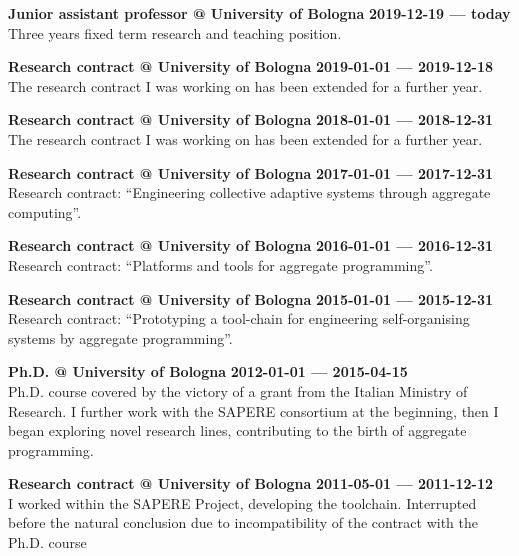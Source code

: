 \textbf{Junior assistant professor @ University of Bologna} \hfill \textbf{2019-12-19 --- today}\\
Three years fixed term research and teaching position.

\halfblankline{}

\textbf{Research contract @ University of Bologna} \hfill \textbf{2019-01-01 --- 2019-12-18}\\
The research contract I was working on has been extended for a further year.

\halfblankline{}

\textbf{Research contract @ University of Bologna} \hfill \textbf{2018-01-01 --- 2018-12-31}\\
The research contract I was working on has been extended for a further year.

\halfblankline{}

\textbf{Research contract @ University of Bologna} \hfill \textbf{2017-01-01 --- 2017-12-31}\\
Research contract: ``Engineering collective adaptive systems through aggregate computing''.

\halfblankline{}

\textbf{Research contract @ University of Bologna} \hfill \textbf{2016-01-01 --- 2016-12-31}\\
Research contract: ``Platforms and tools for aggregate programming''.

\halfblankline{}

\textbf{Research contract @ University of Bologna} \hfill \textbf{2015-01-01 --- 2015-12-31}\\
Research contract: ``Prototyping a tool-chain for engineering self-organising systems by aggregate programming''.

\halfblankline{}

\textbf{Ph.D. @ University of Bologna} \hfill \textbf{2012-01-01 --- 2015-04-15}\\
Ph.D. course covered by the victory of a grant from the Italian Ministry of Research.
I further work with the SAPERE consortium at the beginning, then I began exploring novel research lines, contributing to the birth of aggregate programming.

\halfblankline{}

\textbf{Research contract @ University of Bologna} \hfill \textbf{2011-05-01 --- 2011-12-12}\\
I worked within the SAPERE Project, developing the toolchain.
Interrupted before the natural conclusion due to incompatibility of the contract with the Ph.D. course
